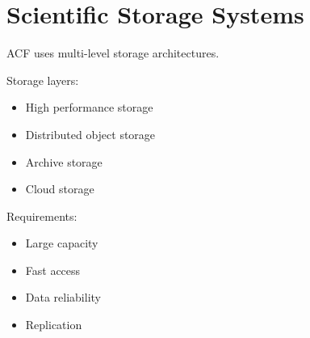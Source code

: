 \section{Scientific Storage Systems}


ACF uses multi-level storage architectures.



Storage layers:


\begin{itemize}

\item High performance storage

\item Distributed object storage

\item Archive storage

\item Cloud storage

\end{itemize}



Requirements:


\begin{itemize}

\item Large capacity

\item Fast access

\item Data reliability

\item Replication


\end{itemize}
